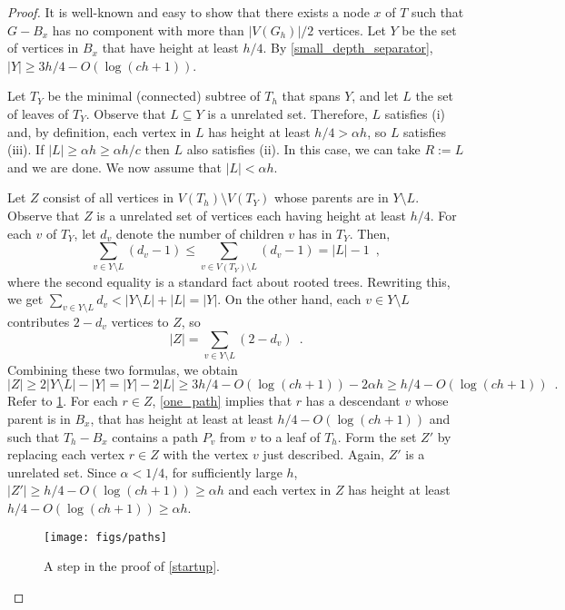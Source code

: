 \documentclass{patmorin}
\renewcommand{\le}{\leqslant}
\renewcommand{\ge}{\geqslant}
\begin{document}
\begin{proof}
  It is well-known and easy to show that there exists a node $x$ of $T$ such that $G-B_x$ has no component with more than $|V(G_h)|/2$ vertices. Let $Y$ be the set of vertices in $B_x$ that have height at least $h/4$.  By \cref{small_depth_separator}, $|Y|\ge 3h/4 - O(\log (ch+1))$.

  Let $T_Y$ be the minimal (connected) subtree of $T_h$ that spans $Y$, and let $L$ the set of leaves of $T_Y$.  Observe that $L\subseteq Y$ is a unrelated set. Therefore, $L$ satisfies (i) and, by definition, each vertex in $L$ has height at least $h/4 > \alpha h$, so $L$ satisfies (iii).  If $|L|\ge \alpha h \ge \alpha h/c$ then $L$ also satisfies (ii).  In this case, we can take $R:=L$ and we are done.  We now assume that $|L|< \alpha h$.

  Let $Z$ consist of all vertices in $V(T_h)\setminus V(T_Y)$ whose parents are in $Y\setminus L$.   Observe that $Z$ is a unrelated set of vertices each having height at least $h/4$. For each $v$ of $T_Y$, let $d_v$ denote the number of children $v$ has in $T_Y$.  Then,
  \[
     \sum_{v\in Y\setminus L} (d_v-1)
     \le \sum_{v\in V(T_Y)\setminus L} (d_v-1)
     = |L|-1 \enspace ,
  \]
  where the second equality is a standard fact about rooted trees.
  Rewriting this, we get $\sum_{v\in Y\setminus L} {d_v} < |Y\setminus L| + |L| = |Y|$.  On the other hand, each $v\in Y\setminus L$ contributes $2-d_v$ vertices to $Z$, so
  \[
    |Z| = \sum_{v\in Y\setminus L} (2-d_v) \enspace .
  \]
  Combining these two formulas, we obtain
  \[
    |Z| \ge 2|Y\setminus L| - |Y| = |Y| - 2|L|
    \ge 3h/4-O(\log(ch+1)) - 2\alpha h
    \ge h/4-O(\log(ch+1)) \enspace .
  \]
  Refer to \cref{paths}.  For each $r\in Z$, \cref{one_path} implies that $r$ has a descendant $v$ whose parent is in $B_x$, that has height at least at least $h/4-O(\log(ch+1))$ and such that $T_h-B_x$ contains a path $P_{v}$ from $v$ to a leaf of $T_h$.  Form the set $Z'$ by replacing each vertex $r\in Z$ with the vertex $v$ just described.  Again, $Z'$ is a unrelated set.  Since $\alpha < 1/4$, for sufficiently large $h$, $|Z'|\ge h/4 - O(\log(ch+1)) \ge \alpha h$ and each vertex in $Z$ has height at least $h/4 - O(\log(ch+1)) \ge \alpha h$.

  \begin{figure}
    \begin{center}
      \texttt{[image: figs/paths]}
    \end{center}
    \caption{A step in the proof of \cref{startup}.}
    \label{paths}
  \end{figure}


\end{proof}
\end{document}
